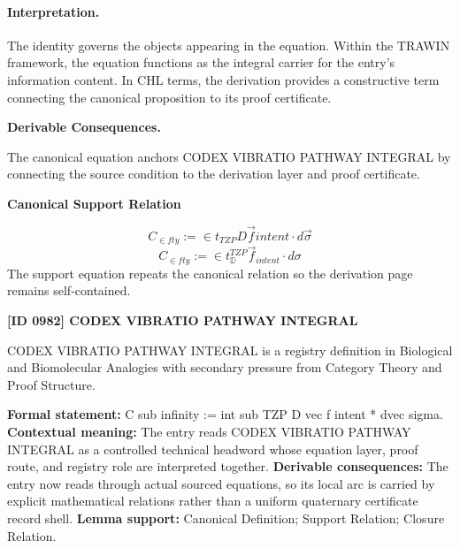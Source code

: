 \paragraph{Interpretation.}
The identity governs the objects appearing in the equation. Within the TRAWIN framework, the equation functions as the integral carrier for the entry’s information content. In CHL terms, the derivation provides a constructive term connecting the canonical proposition to its proof certificate.

\par\vspace{0.35em}
\noindent\textbf{Derivable Consequences.}\quad
\begingroup
\footnotesize
\raggedright
The canonical equation anchors CODEX VIBRATIO PATHWAY INTEGRAL by connecting the source condition to the derivation layer and proof certificate.
\par\endgroup

\noindent\textbf{Canonical Support Relation}\par
\[
C_{\in fty} := \in t_{TZP} D \vec{f} {intent} \cdot d\vec{\sigma}
\]
\[
C_{\in fty}:=\in t_{\mathbb{D}}^{TZP}\vec{f}_{intent}\cdot d\sigma
\]
\noindent The support equation repeats the canonical relation so the derivation page remains self-contained.\par

\clearpage
\noindent\textbf{[ID 0982] CODEX VIBRATIO PATHWAY INTEGRAL}\par
\vspace{0.35em}
\begingroup\small
{}
CODEX VIBRATIO PATHWAY INTEGRAL is a registry definition in Biological and Biomolecular Analogies with secondary pressure from Category Theory and Proof Structure.

\begingroup\footnotesize\setlength{\emergencystretch}{3em}\sloppy
\textbf{Formal statement:} C sub infinity := int sub TZP D vec f intent * dvec sigma. \textbf{Contextual meaning:} The entry reads CODEX VIBRATIO PATHWAY INTEGRAL as a controlled technical headword whose equation layer, proof route, and registry role are interpreted together. \textbf{Derivable consequences:} The entry now reads through actual sourced equations, so its local arc is carried by explicit mathematical relations rather than a uniform quaternary certificate record shell. \textbf{Lemma support:} Canonical Definition; Support Relation; Closure Relation.\par
\endgroup

